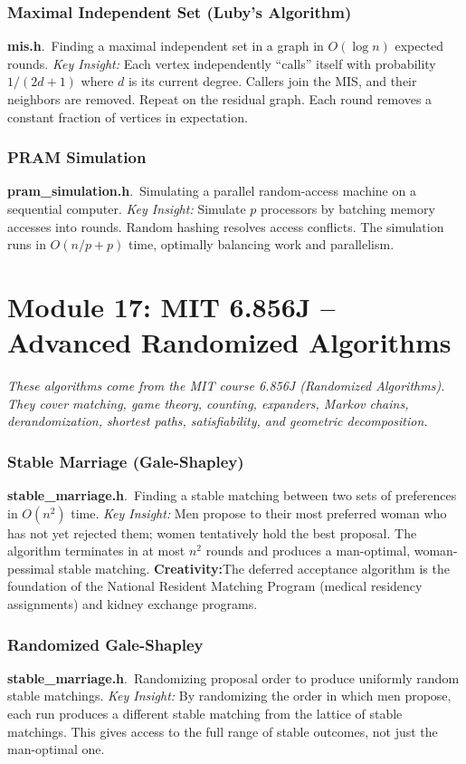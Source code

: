 \documentclass[11pt,a4paper]{article}
\newcommand{\algo}[2]{\textbf{#1}.\ #2}
\newcommand{\insight}{\textit{Key Insight: }}
\newcommand{\creative}{\textcolor{orange!80!black}{\textbf{Creativity:}}}
\begin{document}
\subsubsection{Maximal Independent Set (Luby's Algorithm)}
\algo{mis.h}{Finding a maximal independent set in a graph in \(O(\log n)\) expected rounds.}
\insight Each vertex independently ``calls'' itself with probability \(1/(2d+1)\) where \(d\) is its current degree. Callers join the MIS, and their neighbors are removed. Repeat on the residual graph. Each round removes a constant fraction of vertices in expectation.

\subsubsection{PRAM Simulation}
\algo{pram\_simulation.h}{Simulating a parallel random-access machine on a sequential computer.}
\insight Simulate \(p\) processors by batching memory accesses into rounds. Random hashing resolves access conflicts. The simulation runs in \(O(n/p + p)\) time, optimally balancing work and parallelism.

\section{Module 17: MIT 6.856J -- Advanced Randomized Algorithms}
\label{sec:mit6856}

\textit{These algorithms come from the MIT course 6.856J (Randomized Algorithms). They cover matching, game theory, counting, expanders, Markov chains, derandomization, shortest paths, satisfiability, and geometric decomposition.}

\subsubsection{Stable Marriage (Gale-Shapley)}
\algo{stable\_marriage.h}{Finding a stable matching between two sets of preferences in \(O(n^2)\) time.}
\insight Men propose to their most preferred woman who has not yet rejected them; women tentatively hold the best proposal. The algorithm terminates in at most \(n^2\) rounds and produces a man-optimal, woman-pessimal stable matching.
\creative The deferred acceptance algorithm is the foundation of the National Resident Matching Program (medical residency assignments) and kidney exchange programs.

\subsubsection{Randomized Gale-Shapley}
\algo{stable\_marriage.h}{Randomizing proposal order to produce uniformly random stable matchings.}
\insight By randomizing the order in which men propose, each run produces a different stable matching from the lattice of stable matchings. This gives access to the full range of stable outcomes, not just the man-optimal one.
\end{document}
